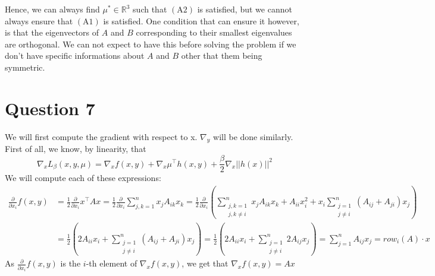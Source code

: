 \documentclass{article}
\newcommand{\R}{\mathbb{R}}
\newcommand{\tp}{^\top}
\newcommand{\p}{\frac{\partial}{\partial x_i}}
\begin{document}
Hence, we can always find $\mu^*\in\R^3$ such that $(\text{A}2)$ is satisfied, but we cannot always ensure that $(\text{A}1)$ is satisfied. One condition that can ensure it however, is that the eigenvectors of $A$ and $B$ corresponding to their smallest eigenvalues are orthogonal. We can not expect to have this before solving the problem if we don't have specific informations about $A$ and $B$ other that them being symmetric.

\begin{comment}
In particular, taking the scalar product of the first equality with $x^*$ and of the second one with $y^*$ and using that $h(x^*, y^*)=0$, gives a new system : 
$$\begin{cases} -(x^*)\tp Ax^* = -2\mu_1 (x^*)\tp x^* +\mu_3 (x^*)\tp y^* \\
-(y^*)\tp By^* = -2\mu_2(y^*)\tp y^* +\mu_3(y^*)\tp x^*\end{cases}
\iff 
\begin{cases} -(x^*)\tp Ax^* = -2\mu_1\\
-(y^*)\tp By^* = -2\mu_2\end{cases}
\iff 
\begin{cases} (x^*)\tp (A -2\mu_1 I)x^* = 0\\
(y^*)\tp (B-2\mu_2 I)y^* =0 \end{cases}
$$
\end{comment}


\section*{Question 7}

We will first compute the gradient with respect to x. $\nabla_y$ will be done similarly.\\
First of all, we know, by linearity, that 
$$\nabla_x L_{\beta}(x,y,\mu)=\nabla_x f(x,y) + \nabla_x \mu\tp h(x,y)+ \frac{\beta}{2} \nabla_x ||h(x)||^2$$
We will compute each of these expressions:\\
\begin{align*}
\p f(x,y)&=\frac{1}{2} \p x\tp A x=\frac{1}{2} \p \sum_{j,k=1}^n x_j A_{ik} x_k=\frac{1}{2} \p \left( \sum_{\substack{j,k=1\\ j,k\neq i}}^n x_j A_{ik} x_k+A_{ii}x_i^2+ x_i \sum_{\substack{j=1 \\ j\neq i}}^n (A_{ij}+A_{ji})x_j \right)\\
&=\frac{1}{2}\left( 2 A_{ii} x_i +  \sum_{\substack{j=1 \\ j\neq i}}^n (A_{ij}+A_{ji})x_j \right)=\frac{1}{2}\left( 2 A_{ii} x_i +  \sum_{\substack{j=1 \\ j\neq i}}^n 2 A_{ij}x_j \right)= \sum_{j=1}^n  A_{ij}x_j =row_i (A) \cdot x
\end{align*}
As $\p f(x,y)$ is the $i$-th element of $\nabla_x f(x,y)$, we get that $\nabla_x f(x,y)= Ax$ \\
\end{document}
